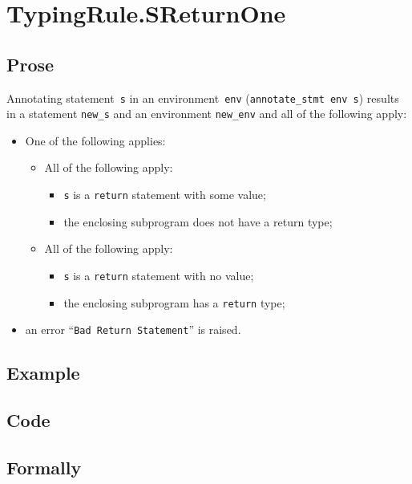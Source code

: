 \documentclass{book}
\begin{document}
\section{TypingRule.SReturnOne \label{sec:TypingRule.SReturnOne}}

  \subsection{Prose}
Annotating statement~\texttt{s} in an environment~\texttt{env}
(\texttt{annotate\_stmt env s}) results in a statement \texttt{new\_s} and an
environment \texttt{new\_env} and all of the following apply:
   \begin{itemize}
   \item One of the following applies:
     \begin{itemize}
     \item All of the following apply:
       \begin{itemize}
       \item \texttt{s} is a \texttt{return} statement with some value;
       \item the enclosing subprogram does not have a return type;
       \end{itemize}
     \item All of the following apply:
       \begin{itemize}
       \item \texttt{s} is a \texttt{return} statement with no value;
       \item the enclosing subprogram has a \texttt{return} type;
       \end{itemize}
     \end{itemize}
   \item an error ``\texttt{Bad Return Statement}'' is raised.
   \end{itemize}

  \subsection{Example}

  \subsection{Code}

\begin{emptyformal}
    \subsection{Formally}      
\end{emptyformal}
\end{document}
